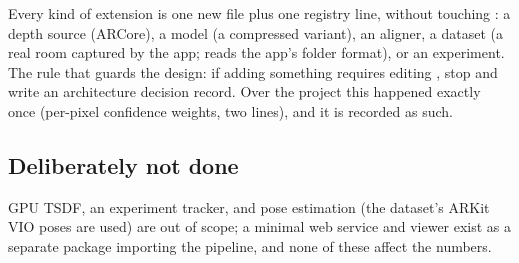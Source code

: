 Every kind of extension is one new file plus one registry line, without touching : a depth source
(ARCore), a model (a compressed variant), an aligner, a dataset (a real room captured by the app;
 reads the app's folder format), or an experiment. The rule that guards the design: if adding
something requires editing , stop and write an architecture decision record. Over the project this
happened exactly once (per-pixel confidence weights, two lines), and it is recorded as such.

\subsection{Deliberately not done}
GPU TSDF, an experiment tracker, and pose estimation (the dataset's ARKit VIO poses are used) are out of scope; a
minimal web service and viewer exist as a separate package importing the pipeline, and none of these affect the numbers.
